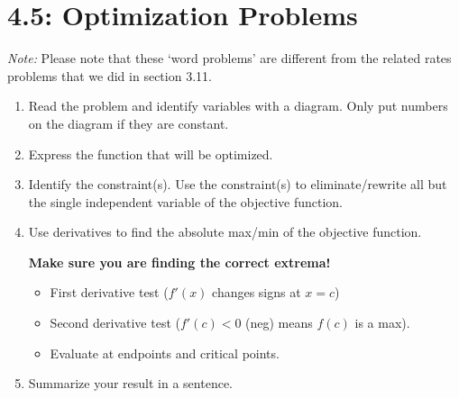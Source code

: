 \documentclass[mathNotesPreamble]{subfiles}
\begin{document}
\section{4.5: Optimization Problems}
\textit{Note: } Please note that these `word problems' are different from the related rates problems that we did in section 3.11.

\begin{thmBox*}
  \begin{enumerate}
    \item Read the problem and identify variables with a diagram. Only put numbers on the diagram if they are constant.
    \item Express the function that will be optimized.
    \item Identify the constraint(s). Use the constraint(s) to eliminate/rewrite all but the single independent variable of the objective function.
    \item Use derivatives to find the absolute max/min of the objective function.
    
      \textbf{Make sure you are finding the correct extrema!}
      \begin{itemize}
        \item First derivative test ($f'(x)$ changes signs at $x=c$)
        \item Second derivative test ($f'(c)<0$ (neg) means $f(c)$ is a max).
        \item Evaluate at endpoints and critical points.
      \end{itemize}
    \item Summarize your result in a sentence.
  \end{enumerate}
\end{thmBox*}
\pagebreak
\end{document}
